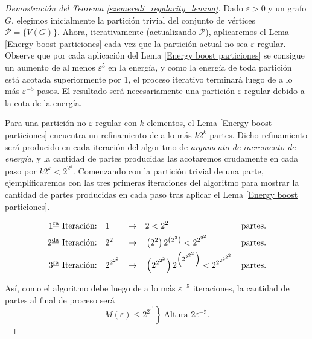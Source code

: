 \documentclass{article}[14pts]
\let\varepsilon=\varepsilon
\begin{document}
\begin{proof}[Demostración del Teorema \ref{szemeredi_regularity_lemma}]
    Dado $\varepsilon > 0$ y un grafo $G$, elegimos inicialmente la partición trivial del conjunto de vértices $\mathcal{P} = \lbrace V(G)\rbrace$. Ahora, iterativamente (actualizando $\mathcal{P}$), aplicaremos el Lema \ref{Energy boost particiones} cada vez que la partición actual no sea $\varepsilon$-regular. Observe que por cada aplicación del Lema \ref{Energy boost particiones} se consigue un aumento de al menos $\varepsilon^{5}$ en la energía, y como la energía de toda partición está acotada superiormente por 1, el proceso iterativo terminará luego de a lo más $\varepsilon^{-5}$ pasos. El resultado será necesariamente una partición $\varepsilon$-regular debido a la cota de la energía. 

    Para una partición no $\varepsilon$-regular con $k$ elementos, el Lema \ref{Energy boost particiones} encuentra un refinamiento de a lo más $k2^{k}$ partes. Dicho refinamiento será producido en cada iteración del algoritmo de \emph{argumento de incremento de energía}, y la cantidad de partes producidas las acotaremos crudamente en cada paso por $k2^{k} < 2^{2^{k}}$. Comenzando con la partición trivial de una parte, ejemplificaremos con las tres primeras iteraciones del algoritmo para mostrar la cantidad de partes producidas en cada paso tras aplicar el Lema \ref{Energy boost particiones}.
    
    \begin{equation*}
        \begin{aligned}
            1^{\text{\underline{ra}}}\ \text{Iteración:}\quad & 1 & \to\quad & 2 < 2^{2} & \text{partes.}\\
            2^{\text{\underline{da}}}\ \text{Iteración:}\quad & 2^{2} & \to\quad & \left( 2^{2}\right)2^{\left(  2^{2}\right)}  <  2^{2^{2^{2}}} & \text{partes.}\\
            3^{\text{\underline{ra}}}\ \text{Iteración:}\quad & 2^{2^{2^{2}}} & \to\quad & \left( 2^{2^{2^{2}}} \right)2^{\left( 2^{2^{2^{2}}} \right)} < 2^{2^{2^{2^{2^{2}}}}} & \text{partes.}
        \end{aligned}
    \end{equation*}

    Así, como el algoritmo debe luego de a lo más $\varepsilon^{-5}$ iteraciones, la cantidad de partes al final de proceso será
    \begin{equation*}
        M(\varepsilon) \leq \left. 2^{2^{\cdot^{\cdot^{\cdot^{2}}}}}\right\rbrace\ \text{Altura }2\varepsilon^{-5}.
    \end{equation*}
\end{proof}\medskip
\end{document}
